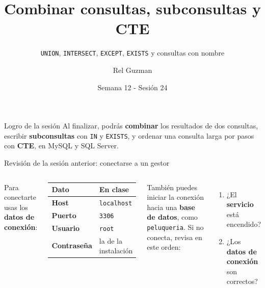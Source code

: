 \documentclass[aspectratio=169,10pt,c]{beamer}
\title{Combinar consultas, subconsultas y CTE}
\subtitle{\texttt{UNION}, \texttt{INTERSECT}, \texttt{EXCEPT}, \texttt{EXISTS} y consultas con nombre}
\date{Semana 12 - Sesión 24}
\author{Rel Guzman}
\begin{document}
{\maketitle}
\begin{frame}[c]
\begin{block}{Logro de la sesión}
Al finalizar, podrás \textbf{combinar} los resultados de dos consultas, escribir \textbf{subconsultas} con \texttt{IN} y \texttt{EXISTS}, y ordenar una consulta larga por pasos con \textbf{CTE}, en MySQL y SQL Server.
\end{block}
\end{frame}
\begin{frame}{Revisión de la sesión anterior: conectarse a un gestor}
\begin{columns}[c,onlytextwidth]
\small Para conectarte usas los \textbf{datos de conexión}:
\vspace{0.1cm}
\begin{center}
\footnotesize
\renewcommand{\arraystretch}{1.3}
\begin{tabular}{@{}>{\bfseries}ll@{}}
\toprule
Dato & \bfseries En clase \\
\midrule
Host & \texttt{localhost} \\
Puerto & \texttt{3306} \\
Usuario & \texttt{root} \\
Contraseña & la de la instalación \\
\bottomrule
\end{tabular}
\end{center}
\vspace{0.1cm}
\small También puedes iniciar la conexión hacia una \textbf{base de datos}, como \texttt{peluqueria}.
\small Si no conecta, revisa en este orden:
\vspace{0.2cm}
\begin{enumerate}\setlength\itemsep{7pt}
  \item ¿El \textbf{servicio} está encendido?
  \item ¿Los \textbf{datos de conexión} son correctos?
\end{enumerate}
\end{columns}
\vspace{0.4cm}
\end{frame}
\end{document}
